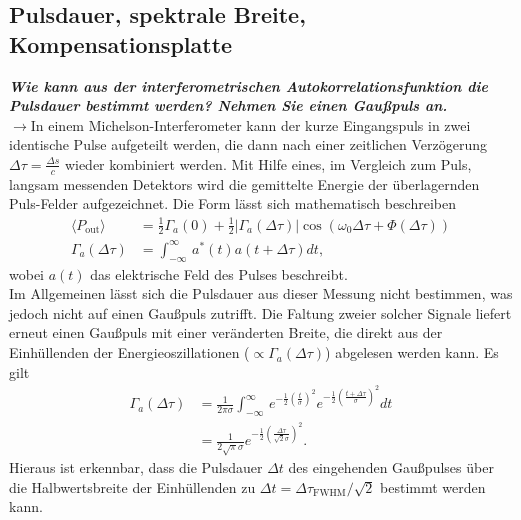 \subsection{\label{subsec:FZV1}Pulsdauer, spektrale Breite, Kompensationsplatte}
\textbf{\textit{Wie kann aus der interferometrischen Autokorrelationsfunktion die Pulsdauer 
bestimmt werden? Nehmen Sie einen Gaußpuls an.}}\\
$\rightarrow$In einem Michelson-Interferometer kann der kurze Eingangspuls 
in zwei identische Pulse aufgeteilt werden, die dann nach einer zeitlichen Verzögerung
$\Delta \tau=\frac{\Delta{s}}{c}$ wieder kombiniert werden. Mit Hilfe eines, im Vergleich 
zum Puls, langsam messenden Detektors wird die gemittelte Energie der überlagernden 
Puls-Felder aufgezeichnet. Die Form lässt sich mathematisch beschreiben \cite{UltraFast}
\begin{align}
    \langle P_{\text{out}}\rangle &= \frac{1}{2}\Gamma_{a}(0) + \frac{1}{2}|\Gamma_{a}(\Delta \tau)|\cos(\omega_{0}\Delta\tau + \Phi(\Delta\tau)) \\
    \Gamma_{a}(\Delta \tau) &= \int_{-\infty}^{\infty}\,a^{*}(t)a(t+\Delta \tau) dt,
\end{align}  
wobei $a(t)$ das elektrische Feld des Pulses beschreibt. \\
Im Allgemeinen lässt sich die Pulsdauer aus dieser Messung nicht bestimmen, was jedoch nicht 
auf einen Gaußpuls zutrifft. Die Faltung zweier solcher Signale liefert erneut einen Gaußpuls mit einer
veränderten Breite, die direkt aus der Einhüllenden der Energieoszillationen 
($\propto \Gamma_{a}(\Delta \tau)$) abgelesen werden kann. 
Es gilt 
\begin{align}
    \Gamma_{a}(\Delta \tau) &= \frac{1}{2\pi\sigma}\int_{-\infty}^{\infty}\,e^{-\frac{1}{2}(\frac{t}{\sigma})^{2}}
    e^{-\frac{1}{2}(\frac{t+\Delta \tau}{\sigma})^{2}} dt \\
    &= \frac{1}{2\sqrt{\pi}\sigma}e^{-\frac{1}{2}(\frac{\Delta \tau}{\sqrt{2}\sigma})^{2}}.
\end{align}
Hieraus ist erkennbar, dass die Pulsdauer $\Delta t$ des eingehenden Gaußpulses über die Halbwertsbreite der 
Einhüllenden zu $\Delta t = \Delta \tau_{\text{FWHM}}/\sqrt{2}$ bestimmt werden kann. \\

